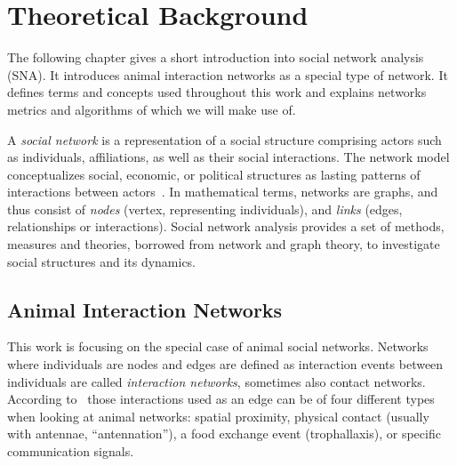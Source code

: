 \chapter{Theoretical Background}
\label{ch:bg}
The following chapter gives a short introduction into social network analysis (SNA). It introduces animal interaction networks as a special type of network. It defines terms and concepts used throughout this work and explains networks metrics and algorithms of which we will make use of.

A \emph{social network} is a representation of a social structure comprising actors such as individuals, affiliations, as well as their social interactions.
The network model conceptualizes social, economic, or political structures as lasting patterns of interactions between actors~\cite{wasserman1994social}.
In mathematical terms, networks are graphs, and thus consist of \emph{nodes} (vertex, representing individuals), and \emph{links} (edges, relationships or interactions).
Social network analysis provides a set of methods, measures and theories, borrowed from network and graph theory, to investigate social structures and its dynamics.

\section{Animal Interaction Networks}
\label{sec:animalNW}
This work is focusing on the special case of animal social networks.
Networks where individuals are nodes and edges are defined as interaction events between individuals are called \emph{interaction networks}, sometimes also contact networks. 
According to~\textcite{charbonneau2013social} those interactions used as an edge can be of four different types when looking at animal networks: spatial proximity, physical contact (usually with antennae, “antennation”), a food exchange event (trophallaxis), or specific communication signals.

